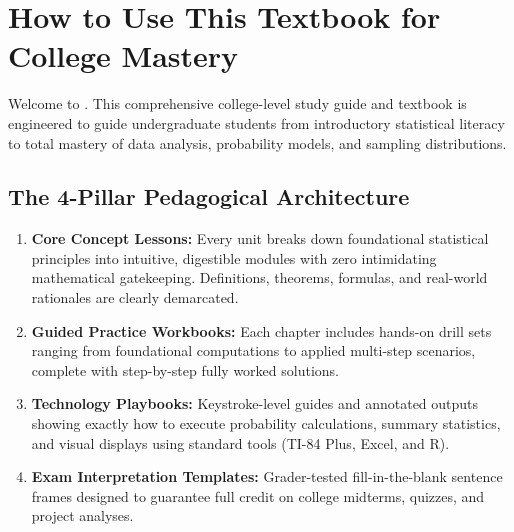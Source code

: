 \tableofcontents
\clearpage

\chapter*{How to Use This Textbook for College Mastery}

Welcome to \textbf{\BookTitle}. This comprehensive college-level study guide and textbook is engineered to guide undergraduate students from introductory statistical literacy to total mastery of data analysis, probability models, and sampling distributions.

\section*{The 4-Pillar Pedagogical Architecture}
\begin{enumerate}[leftmargin=1.5em]
  \item \textbf{Core Concept Lessons:} Every unit breaks down foundational statistical principles into intuitive, digestible modules with zero intimidating mathematical gatekeeping. Definitions, theorems, formulas, and real-world rationales are clearly demarcated.
  \item \textbf{Guided Practice Workbooks:} Each chapter includes hands-on drill sets ranging from foundational computations to applied multi-step scenarios, complete with step-by-step fully worked solutions.
  \item \textbf{Technology Playbooks:} Keystroke-level guides and annotated outputs showing exactly how to execute probability calculations, summary statistics, and visual displays using standard tools (TI-84 Plus, Excel, and R).
  \item \textbf{Exam Interpretation Templates:} Grader-tested fill-in-the-blank sentence frames designed to guarantee full credit on college midterms, quizzes, and project analyses.
\end{enumerate}

